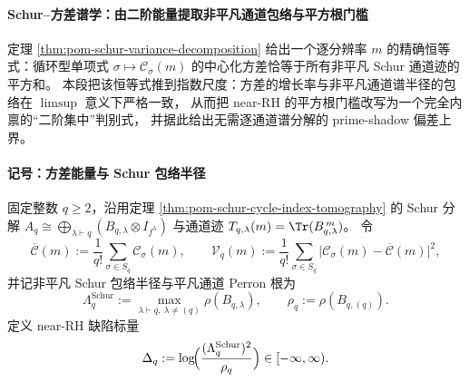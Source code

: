 
\paragraph{Schur--方差谱学：由二阶能量提取非平凡通道包络与平方根门槛}
定理 \ref{thm:pom-schur-variance-decomposition} 给出一个逐分辨率 \(m\) 的精确恒等式：循环型单项式
\(\sigma\mapsto \mathcal C_\sigma(m)\) 的中心化方差恰等于所有非平凡 Schur 通道迹的平方和。
本段把该恒等式推到指数尺度：方差的增长率与非平凡通道谱半径的包络在 \(\limsup\) 意义下严格一致，
从而把 near-RH 的平方根门槛改写为一个完全内禀的“二阶集中”判别式，
并据此给出无需逐通道谱分解的 prime-shadow 偏差上界。

\paragraph{记号：方差能量与 Schur 包络半径}
固定整数 \(q\ge 2\)，沿用定理 \ref{thm:pom-schur-cycle-index-tomography} 的 Schur 分解
\(
A_q\cong\bigoplus_{\lambda\vdash q}(B_{q,\lambda}\otimes I_{f^\lambda})
\)
与通道迹 \(T_{q,\lambda}(m)=\Tr(B_{q,\lambda}^{\,m})\)。
令
\[
\overline{\mathcal C}(m):=\frac{1}{q!}\sum_{\sigma\in S_q}\mathcal{C}_\sigma(m),
\qquad
\mathcal V_q(m):=\frac{1}{q!}\sum_{\sigma\in S_q}\bigl|\mathcal{C}_\sigma(m)-\overline{\mathcal C}(m)\bigr|^2,
\]
并记非平凡 Schur 包络半径与平凡通道 Perron 根为
\[
\Lambda_q^{\mathrm{Schur}}
:=\max_{\lambda\vdash q,\ \lambda\neq(q)}\rho(B_{q,\lambda}),
\qquad
\rho_q:=\rho(B_{q,(q)}).
\]
定义 near-RH 缺陷标量
\[
\Delta_q:=\log\!\Bigl(\frac{(\Lambda_q^{\mathrm{Schur}})^2}{\rho_q}\Bigr)\in[-\infty,\infty).
\]

